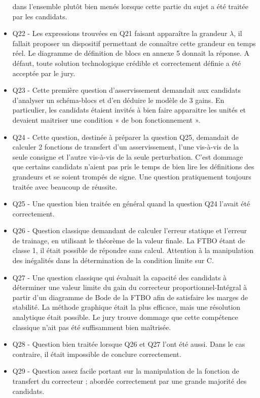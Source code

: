 \documentclass[10pt,fleqn]{article} %
\begin{document}
\begin{itemize}
dans l’ensemble plutôt bien menés lorsque cette partie du sujet a été traitée par les candidats.
\item Q22 - Les expressions trouvées en Q21 faisant apparaître la grandeur $\lambda$, il fallait proposer un dispositif
permettant de connaître cette grandeur en temps réel. Le diagramme de définition de blocs en annexe
5 donnait la réponse. A défaut, toute solution technologique crédible et correctement définie a été
acceptée par le jury.
\item Q23 - Cette première question d’asservissement demandait aux candidats d’analyser un schéma-blocs
et d’en déduire le modèle de 3 gains. En particulier, les candidats étaient invités à bien faire apparaitre
les unités et devaient maitriser une condition « de bon fonctionnement ».
\item Q24 - Cette question, destinée à préparer la question Q25, demandait de calculer 2 fonctions de
transfert d’un asservissement, l’une vis-à-vis de la seule consigne et l’autre vis-à-vis de la seule
perturbation. C’est dommage que certains candidats n’aient pas pris le temps de bien lire les définitions
des grandeurs et se soient trompés de signe. Une question pratiquement toujours traitée avec beaucoup
de réussite.
\item Q25 - Une question bien traitée en général quand la question Q24 l’avait été correctement.
\item Q26 - Question classique demandant de calculer l’erreur statique et l’erreur de trainage, en utilisant
le théorème de la valeur finale. La FTBO étant de classe 1, il était possible de répondre sans calcul.
Attention à la manipulation des inégalités dans la détermination de la condition limite sur C.
\item Q27 - Une question classique qui évaluait la capacité des candidats à déterminer une valeur limite du
gain du correcteur proportionnel-Intégral à partir d’un diagramme de Bode de la FTBO afin de satisfaire
les marges de stabilité. La méthode graphique était la plus efficace, mais une résolution analytique
était possible. Le jury trouve dommage que cette compétence classique n’ait pas été suffisamment bien
maîtrisée.
\item Q28 - Question bien traitée lorsque Q26 et Q27 l’ont été aussi. Dans le cas contraire, il était impossible
de conclure correctement.
\item Q29 - Question assez facile portant sur la manipulation de la fonction de transfert du correcteur ;
abordée correctement par une grande majorité des candidats.

\end{itemize}
\end{document}
